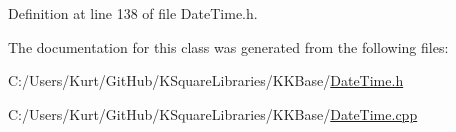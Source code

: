 Definition at line 138 of file Date\+Time.\+h.



The documentation for this class was generated from the following files\+:\begin{DoxyCompactItemize}
\item 
C\+:/\+Users/\+Kurt/\+Git\+Hub/\+K\+Square\+Libraries/\+K\+K\+Base/\hyperlink{_date_time_8h}{Date\+Time.\+h}\item 
C\+:/\+Users/\+Kurt/\+Git\+Hub/\+K\+Square\+Libraries/\+K\+K\+Base/\hyperlink{_date_time_8cpp}{Date\+Time.\+cpp}\end{DoxyCompactItemize}
